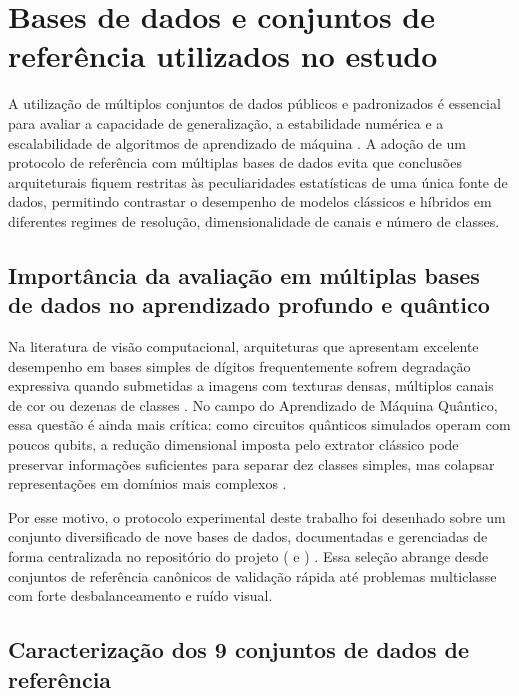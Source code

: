 \documentclass[
    12pt,
    openright,
    oneside,
    a4paper,
    english,
    brazil
]{abntex2}
\begin{document}
\section{Bases de dados e conjuntos de referência utilizados no estudo}

A utilização de múltiplos conjuntos de dados públicos e padronizados é essencial para avaliar a capacidade de generalização, a estabilidade numérica e a escalabilidade de algoritmos de aprendizado de máquina \cite{Wazlawick2020,goodfellow2016deep}. A adoção de um protocolo de referência com múltiplas bases de dados evita que conclusões arquiteturais fiquem restritas às peculiaridades estatísticas de uma única fonte de dados, permitindo contrastar o desempenho de modelos clássicos e híbridos em diferentes regimes de resolução, dimensionalidade de canais e número de classes.

\subsection{Importância da avaliação em múltiplas bases de dados no aprendizado profundo e quântico}

Na literatura de visão computacional, arquiteturas que apresentam excelente desempenho em bases simples de dígitos frequentemente sofrem degradação expressiva quando submetidas a imagens com texturas densas, múltiplos canais de cor ou dezenas de classes \cite{LeCun2015}. No campo do Aprendizado de Máquina Quântico, essa questão é ainda mais crítica: como circuitos quânticos simulados operam com poucos qubits, a redução dimensional imposta pelo extrator clássico pode preservar informações suficientes para separar dez classes simples, mas colapsar representações em domínios mais complexos \cite{mcclean2018barren,schuld2021effect}.

Por esse motivo, o protocolo experimental deste trabalho foi desenhado sobre um conjunto diversificado de nove bases de dados, documentadas e gerenciadas de forma centralizada no repositório do projeto ( e ) \cite{Wazlawick2020}. Essa seleção abrange desde conjuntos de referência canônicos de validação rápida até problemas multiclasse com forte desbalanceamento e ruído visual.

\subsection{Caracterização dos 9 conjuntos de dados de referência}
\end{document}
